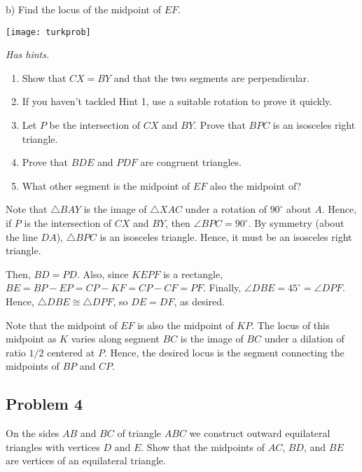 b) Find the locus of the midpoint of $ EF$.

\begin{center}
\texttt{[image: turkprob]}
\end{center}
\textit{Has hints.}
\begin{sketch}
    \begin{enumerate}
        \item Show that $ CX = BY$ and that the two segments are perpendicular.
        \item If you haven't tackled Hint 1, use a suitable rotation to prove it quickly.
        \item Let $ P$ be the intersection of $ CX$ and $ BY$. Prove that $ BPC$ is an isosceles right triangle.
        \item Prove that $ BDE$ and $ PDF$ are congruent triangles.
        \item What other segment is the midpoint of $ EF$ also the midpoint of?
    \end{enumerate}
\end{sketch}


\begin{mdsoln}
Note that $ \triangle BAY$ is the image of $ \triangle XAC$ under a rotation of $ 90^\circ$ about $ A$. Hence, if $ P$ is the intersection of $ CX$ and $ BY$, then $ \angle BPC=90^\circ$. By symmetry (about the line $ DA$), $ \triangle BPC$ is an isosceles triangle. Hence, it must be an isosceles right triangle.

Then, $ BD=PD$. Also, since $ KEPF$ is a rectangle, $ BE=BP-EP=CP-KF=CP-CF=PF$. Finally, $ \angle DBE=45^\circ=\angle DPF$. Hence, $ \triangle DBE\cong \triangle DPF$, so $ DE=DF$, as desired.

Note that the midpoint of $ EF$ is also the midpoint of $ KP$. The locus of this midpoint as $ K$ varies along segment $ BC$ is the image of $ BC$ under a dilation of ratio $ 1/2$ centered at $ P$. Hence, the desired locus is the segment connecting the midpoints of $ BP$ and $ CP$.    
\end{mdsoln}

\subsection{Problem 4}

On the sides $ AB$ and $ BC$ of triangle $ ABC$ we construct outward equilateral triangles with vertices $ D$ and $ E$. Show that the midpoints of $ AC$, $ BD$, and $ BE$ are vertices of an equilateral triangle.

